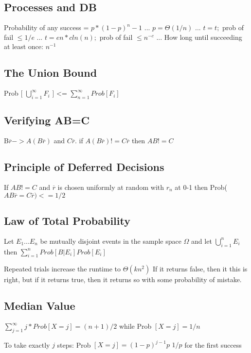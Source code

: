 \subsection{Processes and DB}

Probability of any success =  $p* (1 - p) ^ n-1 $ ...
$p = \Theta(1/n)$ ...
$t = t;$ prob of fail $\leq 1/e$ ...
$t = en*cln(n);$ prob of fail $\leq n^{-c}$ ...
How long until succeeding at least once: $n^{-1}$

\subsection{The Union Bound}
Prob [ $\bigcup\limits_{i=1}^{\infty} F_{i}$ ] <= $\sum_{n=1}^{\infty}  Prob[ F_{i}] $ 


\subsection{Verifying AB=C}

B$\overbar{r} -> A(B\overbar{r})$ and $C\overbar{r}$. if $A(B\overbar{r}) != C\overbar{r}$ then $AB != C$

\subsection{Principle of Deferred Decisions}
If $AB != C$ and $\overbar{r}$ is chosen uniformly at random with $r_n$ at 0-1 then Prob($AB\overbar{r} = C\overbar{r}) <= 1/2$

\subsection{Law of Total Probability}
Let $E_1 ... E_n$ be mutually disjoint events in the sample space $\Omega$ and let $\bigcup\limits_{i=1}^{n} E_{i}$ then $\sum_{i=1}^{n}  Prob[ B | E_{i}] Prob[E_{i}] $ 

Repeated trials increase the runtime to $\Theta(kn^2)$
If it returns false, then it this is right, but if it returns true, then it returns so with some probability of mistake.


\subsection{Median Value}
$\sum_{j=1}^{\infty}  j * Prob[ X = j ]  = (n + 1) / 2$ while Prob $[X = j] = 1/n$

To take exactly $j$ steps: Prob $[X = j] = (1 - p)^{j - 1} p$
$1/p$ for the first success

